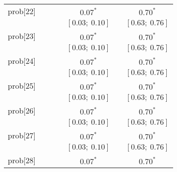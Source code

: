 \begin{table}
\begin{center}
\begin{tabular}{l c c c c c c }
prob[22]  &                           &                           &                           & $0.07^{*}$              &                           & $0.70^{*}$            \\
          &                           &                           &                           & $[0.03;\ 0.10]$         &                           & $[0.63;\ 0.76]$       \\
prob[23]  &                           &                           &                           & $0.07^{*}$              &                           & $0.70^{*}$            \\
          &                           &                           &                           & $[0.03;\ 0.10]$         &                           & $[0.63;\ 0.76]$       \\
prob[24]  &                           &                           &                           & $0.07^{*}$              &                           & $0.70^{*}$            \\
          &                           &                           &                           & $[0.03;\ 0.10]$         &                           & $[0.63;\ 0.76]$       \\
prob[25]  &                           &                           &                           & $0.07^{*}$              &                           & $0.70^{*}$            \\
          &                           &                           &                           & $[0.03;\ 0.10]$         &                           & $[0.63;\ 0.76]$       \\
prob[26]  &                           &                           &                           & $0.07^{*}$              &                           & $0.70^{*}$            \\
          &                           &                           &                           & $[0.03;\ 0.10]$         &                           & $[0.63;\ 0.76]$       \\
prob[27]  &                           &                           &                           & $0.07^{*}$              &                           & $0.70^{*}$            \\
          &                           &                           &                           & $[0.03;\ 0.10]$         &                           & $[0.63;\ 0.76]$       \\
prob[28]  &                           &                           &                           & $0.07^{*}$              &                           & $0.70^{*}$            \\

\end{tabular}
\end{center}
\end{table}
